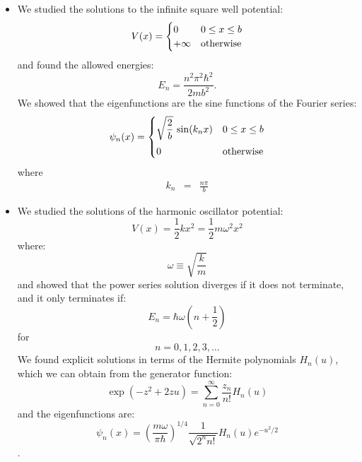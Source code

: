 \documentclass[12pt]{book}
\begin{document}
\begin{itemize}
\item We studied the solutions to the infinite square well potential:
\begin{equation}
V(x) = 
\begin{cases}    
   0 & 0 \leq x \leq b \\
   +\infty & {\rm otherwise} \\
\end{cases}   
\end{equation}
and found the allowed energies:
\begin{equation}
E_n = \frac{n^2 \pi^2 \hbar^2}{2mb^2}.
\end{equation}
We showed that the eigenfunctions are the sine functions of the Fourier series:
\begin{equation}
\psi_n(x) = 
\begin{cases}
{\displaystyle \sqrt{\frac{2}{b}} \, \sin(k_n x)} & 0 \leq x \leq b\\[8pt]
0 & \rm otherwise \\
\end{cases}
\end{equation}
where
\begin{eqnarray*}
k_n&=&\frac{n\pi}{b}
\end{eqnarray*}

\item We studied the solutions of the harmonic oscillator potential:
$$V(x) = \frac{1}{2}k x^2 = \frac{1}{2} m \omega^2 x^2$$
where:
$$\omega \equiv \sqrt{\frac{k}{m}}$$
and showed that the power series solution diverges if it does not terminate, and it only terminates if:
\begin{equation}
E_n = \hbar \omega \left( n + \frac{1}{2} \right)
\end{equation}
for
$$n=0,1,2,3,\ldots$$
We found explicit solutions in terms of the Hermite polynomials $H_n(u)$, which we can obtain from the generator function:
$$\exp(-z^2+2zu) = \sum_{n=0}^{\infty} \frac{z_n}{n!}H_n(u)$$
and the eigenfunctions are:
$$\psi_n(x) = \left( \frac{m \omega}{\pi \hbar} \right)^{1/4} \frac{1}{\sqrt{2^n n!}}H_n(u) e^{-u^2/2}$$.



\end{itemize}
\end{document}
